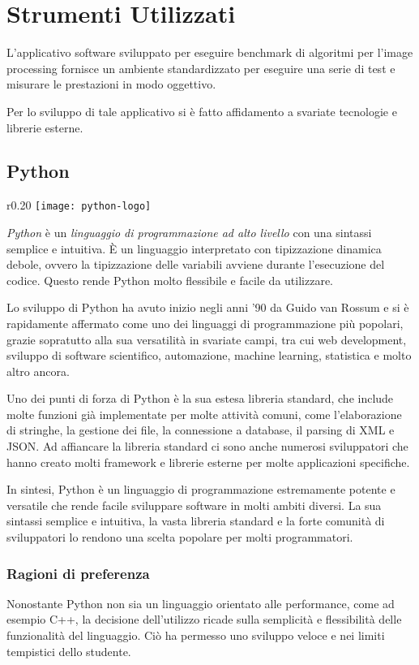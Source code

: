 \chapter{Strumenti Utilizzati}
L'applicativo software sviluppato per eseguire benchmark di algoritmi per l'image processing fornisce un ambiente standardizzato per eseguire una serie di test e misurare le prestazioni in modo oggettivo.\par
Per lo sviluppo di tale applicativo si è fatto affidamento a svariate tecnologie e librerie esterne.

{\section{Python}

\begin{wrapfigure}{r}{0.20\textwidth}
	\centering
	\texttt{[image: python-logo]}
\end{wrapfigure}
\textit{Python} è un \textit{linguaggio di programmazione ad alto livello} con una sintassi semplice e intuitiva. È un linguaggio interpretato con tipizzazione dinamica debole, ovvero la tipizzazione delle variabili avviene durante l'esecuzione del codice. Questo rende Python molto flessibile e facile da utilizzare.\par
Lo sviluppo di Python ha avuto inizio negli anni '90 da Guido van Rossum e si è rapidamente affermato come uno dei linguaggi di programmazione più popolari, grazie sopratutto alla sua versatilità in svariate campi, tra cui web development, sviluppo di software scientifico, automazione, machine learning, statistica e molto altro ancora.\par
Uno dei punti di forza di Python è la sua estesa libreria standard, che include molte funzioni già implementate per molte attività comuni, come l'elaborazione di stringhe, la gestione dei file, la connessione a database, il parsing di XML e JSON. Ad affiancare la libreria standard ci sono anche numerosi sviluppatori che hanno creato molti framework e librerie esterne per molte applicazioni specifiche.\par
In sintesi, Python è un linguaggio di programmazione estremamente potente e versatile che rende facile sviluppare software in molti ambiti diversi. La sua sintassi semplice e intuitiva, la vasta libreria standard e la forte comunità di sviluppatori lo rendono una scelta popolare per molti programmatori.

\subsection{Ragioni di preferenza}
Nonostante Python non sia un linguaggio orientato alle performance, come ad esempio C++, la decisione dell'utilizzo ricade sulla semplicità e flessibilità delle funzionalità del linguaggio. Ciò ha permesso uno sviluppo veloce e nei limiti tempistici dello studente.

}

